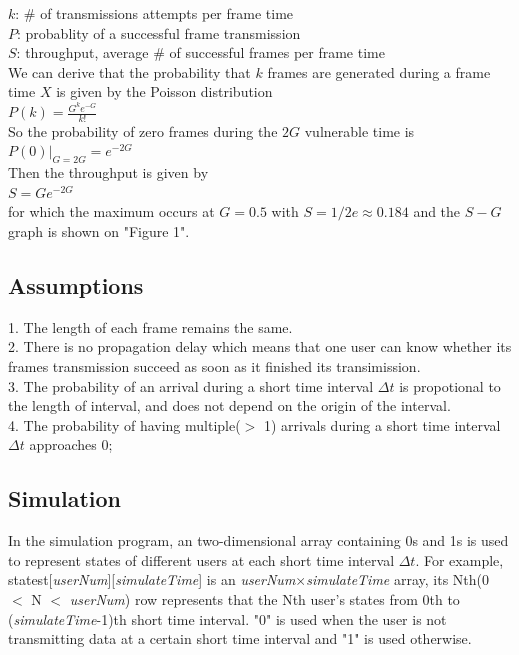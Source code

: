 \documentclass[11pt,a4paper]{report}
\begin{document}
\qquad	\(k\): \# of transmissions attempts per frame time \\

\qquad	\(P\): probablity of a successful frame transmission \\

\qquad	\(S\): throughput, average \# of successful frames per frame time \\

We can derive that the probability that \(k\) frames are generated during a frame time \(X\) is given by the Poisson distribution \\

\qquad	\(P(k) = \frac{G^ke^{-G}}{k!}\) \\

So the probability of zero frames during the \(2G\) vulnerable time is \\

\qquad \(P(0)|_{G=2G} = e^{-2G}\) \\

Then the throughput is given by \\

\qquad \(S = Ge^{-2G}\) \\

for which the maximum occurs at \(G = 0.5\) with \(S = 1/2e \approx 0.184\) and the \(S - G\) graph is shown on "Figure 1".

\subsection*{Assumptions}

1. The length of each frame remains the same. \\
2. There is no propagation delay which means that one user can know whether its frames transmission succeed as soon as it finished its transimission. \\
3. The probability of an arrival during a short time interval \(\Delta t\) is propotional to the length of interval, and does not depend on the origin of the interval. \\
4. The probability of having multiple(\(>\) 1) arrivals during a short time interval \(\Delta t\) approaches 0;

\subsection*{Simulation}
In the simulation program, an two-dimensional array containing 0s and 1s is used to represent states of different users at each short time interval \(\Delta t\). For example, statest[\emph{userNum}][\emph{simulateTime}] is an \emph{userNum}\(\times\)\emph{simulateTime} array, its Nth(0 \(<\) N \(<\) \emph{userNum}) row represents that the Nth user's states from 0th to (\emph{simulateTime}-1)th short time interval. "0" is used when the user is not transmitting data at a certain short time interval and "1" is used otherwise. \\
\end{document}
